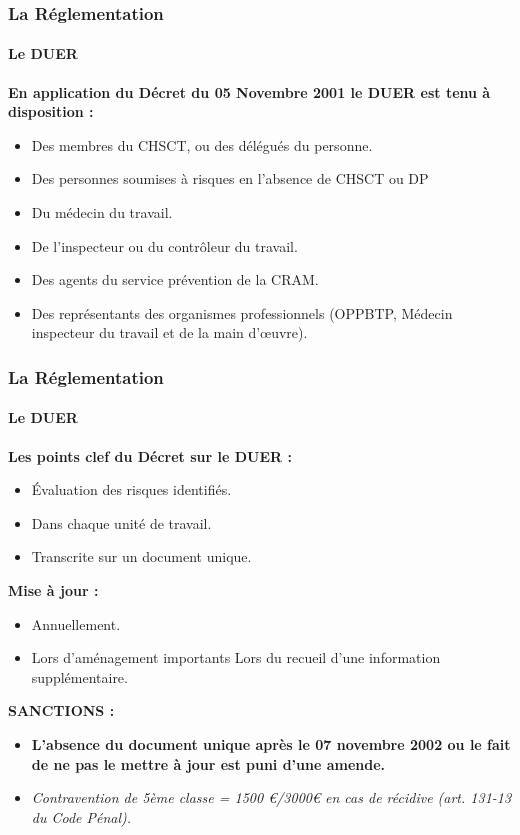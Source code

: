 \documentclass{beamer}
\begin{document}
\begin{frame}
\frametitle{La Réglementation}
\framesubtitle{Le DUER}
\textbf{En application du Décret du 05 Novembre 2001 le DUER est tenu à disposition :}
\begin{itemize}
\item Des membres du CHSCT, ou des délégués du personne.
\item Des personnes soumises à risques en l’absence de CHSCT ou DP
\item Du médecin du travail.
\item De l’inspecteur ou du contrôleur du travail.
\item Des agents du service prévention de la CRAM.
\item Des représentants des organismes professionnels (OPPBTP, Médecin inspecteur du travail et de la main d’œuvre).
\end{itemize}
\end{frame}

\begin{frame}
\frametitle{La Réglementation}
\framesubtitle{Le DUER}
\textbf{Les points clef du Décret sur le DUER :}
\begin{itemize}
\item Évaluation des risques identifiés.
\item Dans chaque unité de travail.
\item Transcrite sur un document unique.
\end{itemize}	
\textbf{Mise à jour :}
\begin{itemize}
\item Annuellement.
\item Lors d’aménagement importants
Lors du recueil d’une information supplémentaire.
\end{itemize}
\textbf{SANCTIONS :}
\begin{itemize}
\item \textbf{L’absence du document unique après le 07 novembre 2002 ou le fait de ne pas le mettre à jour est puni d’une amende.}
\item \textit{Contravention de 5ème classe = 1500 \euro{}/3000\euro{} en cas de récidive (art. 131-13 du Code Pénal).}
\end{itemize}
\end{frame}
\end{document}
